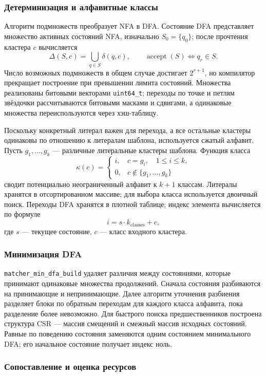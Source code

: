 \documentclass[12pt,a4paper]{article}
\begin{document}
\subsubsection{Детерминизация и алфавитные классы}

Алгоритм подмножеств преобразует NFA в DFA. Состояние DFA представляет
множество активных состояний NFA, изначально $S_0=\{q_0\}$; после
прочтения кластера $c$ вычисляется
\[
 \Delta(S,c)=\bigcup_{q\in S}\delta(q,c),\qquad
 \operatorname{accept}(S)\iff q_r\in S.
\]
Число возможных подмножеств в общем случае достигает $2^{r+1}$,
но компилятор прекращает построение при превышении лимита состояний.
Множества реализованы битовыми векторами \texttt{uint64\_t}; переходы
по точке и петлям звёздочки рассчитываются битовыми масками и сдвигами,
а одинаковые множества переиспользуются через хэш-таблицу.

Поскольку конкретный литерал важен для перехода, а все остальные
кластеры одинаковы по отношению к литералам шаблона, используется
сжатый алфавит. Пусть $g_1,\ldots,g_k$ --- различные литеральные
кластеры шаблона. Функция класса
\[
 \kappa(c)=
 \begin{cases}
  i,&c=g_i,\quad 1\le i\le k,\\
  0,&c\notin\{g_1,\ldots,g_k\}
 \end{cases}
\]
сводит потенциально неограниченный алфавит к $k+1$ классам.
Литералы хранятся в отсортированном массиве; для выбора класса
используется двоичный поиск. Переходы DFA хранятся в плотной
таблице; индекс элемента вычисляется по формуле
\[
  i=s\cdot k_{\mathrm{classes}}+c,
\]
где $s$ --- текущее состояние, $c$ --- класс входного кластера.

\subsubsection{Минимизация DFA}

\texttt{matcher\_min\_dfa\_build} удаляет различия между состояниями,
которые принимают одинаковые множества продолжений. Сначала состояния
разбиваются на принимающие и непринимающие. Далее алгоритм уточнения
разбиения разделяет блоки по обратным переходам для каждого класса
алфавита, пока разделение более невозможно. Для быстрого поиска
предшественников построена структура CSR --- массив смещений и смежный
массив исходных состояний. Равные по поведению состояния заменяются
одним состоянием минимального DFA; его начальное состояние получает
индекс ноль.

\subsubsection{Сопоставление и оценка ресурсов}
\end{document}
